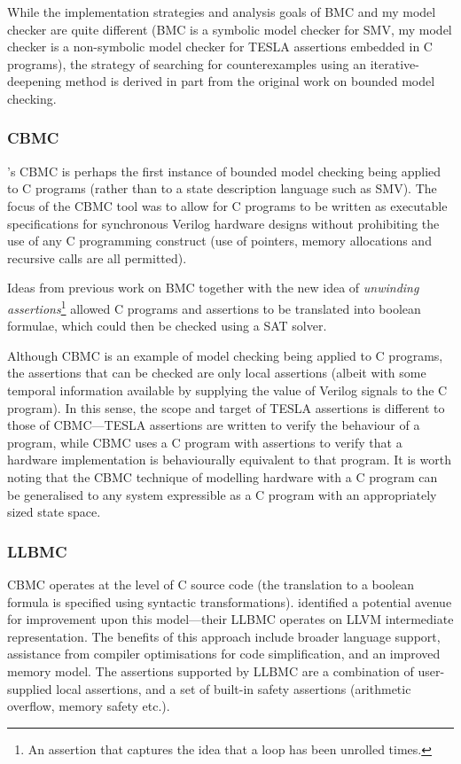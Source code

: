 While the implementation strategies and analysis goals of BMC and my
model checker are quite different (BMC is a symbolic model checker for
SMV, my model checker is a non-symbolic model checker for TESLA
assertions embedded in C programs), the strategy of searching for
counterexamples using an iterative-deepening method is derived in part
from the original work on bounded model checking.

\subsubsection{CBMC}

\citeauthor{clarke_behavioral_2003}'s CBMC \cite{clarke_behavioral_2003}
is perhaps the first instance of bounded model checking being applied to
C programs (rather than to a state description language such as SMV).
The focus of the CBMC tool was to allow for C programs to be written as
executable specifications for synchronous Verilog hardware designs
without prohibiting the use of any C programming construct (use of
pointers, memory allocations and recursive calls are all permitted).

Ideas from previous work on BMC together with the new idea of
\emph{unwinding assertions}\footnote{An assertion that captures the idea
that a loop has been unrolled  times.} allowed C
programs and assertions to be translated into boolean formulae, which
could then be checked using a SAT solver.

Although CBMC is an example of model checking being applied to C
programs, the assertions that can be checked are only local assertions
(albeit with some temporal information available by supplying the value
of Verilog signals to the C program). In this sense, the scope and
target of TESLA assertions is different to those of CBMC---TESLA
assertions are written to verify the behaviour of a program, while CBMC
uses a C program with assertions to verify that a hardware
implementation is behaviourally equivalent to that program. It is worth noting
that the CBMC technique of modelling hardware with a C program can be
generalised to any system expressible as a C program with an appropriately sized
state space.

\subsubsection{LLBMC}

CBMC operates at the level of C source code (the translation to a
boolean formula is specified using syntactic transformations).
\textcite{merz_llbmc:_2012} identified a potential avenue for
improvement upon this model---their LLBMC operates on LLVM
\cite{lattner_llvm:_2002} intermediate representation. The benefits of
this approach include broader language support, assistance from compiler
optimisations for code simplification, and an improved memory model. The
assertions supported by LLBMC are a combination of user-supplied local
assertions, and a set of built-in safety assertions (arithmetic
overflow, memory safety etc.).

